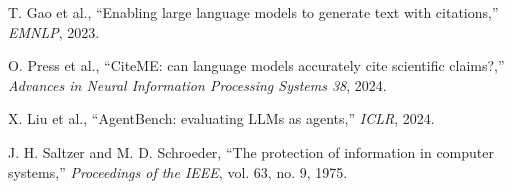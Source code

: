 \documentclass[12pt,a4paper]{report}
\begin{document}
\begin{enumerate}[label={[\arabic*]},leftmargin=2.2em]
  \item \label{ref:gao2023enabling} T. Gao et al., ``Enabling large language models to generate text with citations,'' \emph{EMNLP}, 2023.
  \item \label{ref:press2024citeme} O. Press et al., ``CiteME: can language models accurately cite scientific claims?,'' \emph{Advances in Neural Information Processing Systems 38}, 2024.
  \item \label{ref:liu2024agentbench} X. Liu et al., ``AgentBench: evaluating LLMs as agents,'' \emph{ICLR}, 2024.
  \item \label{ref:saltzer1975} J. H. Saltzer and M. D. Schroeder, ``The protection of information in computer systems,'' \emph{Proceedings of the IEEE}, vol. 63, no. 9, 1975.
\end{enumerate}

\end{document}
